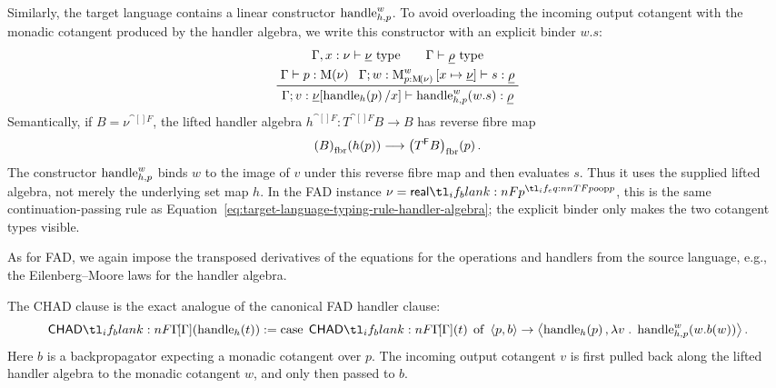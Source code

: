 \documentclass[11pt,a4paper]{article}
\theoremstyle{definition}
\theoremstyle{remark}
\providecommand{\casubst}[3]{#1[#3/#2]}
\providecommand{\fibr}[1]{\left(#1\right)_{\mathrm{fbr}}}
\providecommand{\lintype}[1]{\underline{#1}}
\begin{document}
Similarly, the target language contains a linear constructor
\( \opn[b]{handle}^{w}_{h,p} \).  To avoid overloading the incoming output
cotangent with the monadic cotangent produced by the handler algebra, we write
this constructor with an explicit binder \(w.s\):
\begin{equation}
  \label{eq:appendix-generic-handler-w-typing}
  \begin{gathered}
    \Gamma,x:\nu\vdash \lintype{\nu} \text{ type}
    \qquad
    \Gamma\vdash \lintype{\rho} \text{ type}
    \\
    \prftree{
      \Gamma\vdash p:\Fun[nn]{\opn[b]{M}}{\nu}
    }{
      \Gamma;
      w:
      \opn[b]{M}^{w}_{p:\Fun[nn]{\opn[b]{M}}{\nu}}
      \left[x\mapsto \lintype{\nu}\right]
      \vdash s:\lintype{\rho}
    }{
      \Gamma;
      v:
      \casubst{\lintype{\nu}}{x}{\fn[n]{\opn[b]{handle}_{h}}{p}}
      \vdash
      \fn[n]{\opn[b]{handle}^{w}_{h,p}}{w.s}
      :\lintype{\rho}
    }
  \end{gathered}
\end{equation}
Semantically, if \(B=\nu^{\cat[]{F}}\), the lifted handler algebra
\(h^{\cat[]{F}}:T^{\cat[]{F}}B\to B\) has reverse fibre map
\[
  \Fun[np]{\fibr{B}}{h(p)}
  \longrightarrow
  \Fun[np]{\fibr{ T^{\cat[]{F}}B }}{p}.
\]
The constructor \(\opn[b]{handle}^{w}_{h,p}\) binds \(w\) to the image of
\(v\) under this reverse fibre map and then evaluates \(s\).  Thus it uses the
supplied lifted algebra, not merely the underlying set map \(h\).  In the FAD
instance \(\nu=\srcreal[p]\), this is the same continuation-passing rule as
Equation~\eqref{eq:target-language-typing-rule-handler-algebra}; the explicit
binder only makes the two cotangent types visible.

As for FAD, we again impose the transposed derivatives of the equations for the operations and handlers from the source language, e.g., the Eilenberg--Moore laws for the handler algebra.

The CHAD clause is the exact analogue of the canonical FAD handler
clause:
\begin{equation}
  \label{eq:appendix-generic-handler-chad}
  \Fun[np]{\chad[\Gamma]}{\fn[n]{\opn[b]{handle}_{h}}{t}}
  :=
  \opn[b]{case}\;\Fun[np]{\chad[\Gamma]}{t}\;\opn[b]{of}\;\tuple{p,b}\to
  \tuple{
    \fn[n]{\opn[b]{handle}_{h}}{p},
    \lambda v\; .\;
    \fn[n]{\opn[b]{handle}^{w}_{h,p}}{w.\fn[n]{b}{w}}
  }.
\end{equation}
Here \(b\) is a backpropagator expecting a monadic cotangent over \(p\).  The
incoming output cotangent \(v\) is first pulled back along the lifted handler
algebra to the monadic cotangent \(w\), and only then passed to \(b\).
\end{document}
